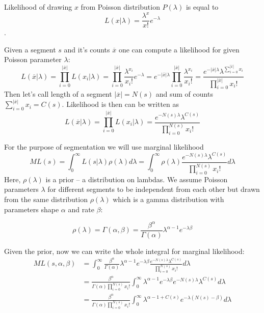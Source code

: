 \documentclass[10pt,letterpaper]{article}
\begin{document}
Likelihood of drawing $x$ from Poisson distribution $P(\lambda)$ is equal to 
$$
L(x | \lambda) = \frac {\lambda^x} {x!} e^{-\lambda}
$$.

Given a segment $s$ and it's counts $\overline{x}$ one can compute a likelihood
for given Poisson parameter $\lambda$:
$$
L(\overline{x}| \lambda) = \prod _{i=0} ^{|\overline{x}|} {L(x_i| \lambda)} = 
\prod _{i=0} ^{|\overline{x}|} \frac {\lambda^{x_i}} {x_i!} e^{-\lambda} = 
e^{-|\overline{x}|\lambda} \prod _{i=0} ^{|\overline{x}|} \frac {\lambda^{x_i}} {x_i!}  = 
\frac {e^{-|\overline{x}|\lambda} \lambda^{\sum _{i=0} ^{|\overline{x}|} x_i}} {\prod _{i=0} ^{|\overline{x}|} x_i!}
$$
Then let's call length of a segment $|\overline{x}| = N(s)$ and sum of counts $\sum _{i=0} ^{|\overline{x}|} x_i = C(s)$.
Likelihood is then can be written as 
$$
L(\overline{x}| \lambda) = \prod _{i=0} ^{|\overline{x}|} {L(x_i| \lambda)} = 
\frac {e^{-N(s)\lambda} \lambda^{C(s)}} {\prod _{i=0} ^{N(s)} x_i!}
$$

For the purpose of segmentation we will use marginal likelihood
$$
    ML(s) = \int _{0} ^{\infty} L(s| \lambda) \rho(\lambda) d\lambda = 
 \int _{0} ^{\infty} \rho(\lambda) \frac {e^{-N(s)\lambda} \lambda^{C(s)}} {\prod _{i=0} ^{N(s)} x_i!} d\lambda
$$
Here, $\rho(\lambda)$ is a prior -- a distribution on lambdas.
We assume Poisson parameters $\lambda$ for different segments to be independent from each other but drawn from the same distribution $\rho(\lambda)$ which is a gamma distribution with parameters shape $\alpha$ and rate $\beta$:

$$
 \rho(\lambda) = \Gamma(\alpha, \beta) = \frac {\beta^\alpha} {\Gamma(\alpha)} \lambda^{\alpha-1} e^{-\lambda \beta}
$$

Given the prior, now we can write the whole integral for marginal likelihood:
\begin{align*}
    ML(s, \alpha, \beta) & = 
 \int _{0} ^{\infty} \frac {\beta^\alpha} {\Gamma(\alpha)} \lambda^{\alpha-1} e^{-\lambda \beta} \frac {e^{-N(s)\lambda} \lambda^{C(s)}} {\prod _{i=0} ^{N(s)} x_i!} d\lambda \\
     & = 
  \frac {\beta^\alpha} {\Gamma(\alpha) \prod _{i=0} ^{N(s)} x_i!} \int _{0} ^{\infty} \lambda^{\alpha-1} e^{-\lambda \beta} {e^{-N(s)\lambda} \lambda^{C(s)}} d\lambda\\
     & = 
    \frac {\beta^\alpha} {\Gamma(\alpha) \prod _{i=0} ^{N(s)} x_i!} \int _{0} ^{\infty} \lambda^{\alpha-1+C(s)}  {e^{-\lambda(N(s)-\beta)} } d\lambda
\end{align*}
\end{document}
